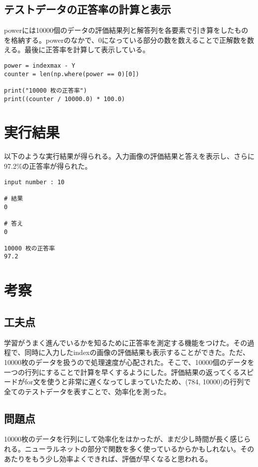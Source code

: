 \documentclass{ujarticle}
\begin{document}
\subsection{テストデータの正答率の計算と表示}
powerには10000個のデータの評価結果列と解答列を各要素で引き算をしたものを格納する。powerのなかで、0になっている部分の数を数えることで正解数を数える。最後に正答率を計算して表示している。
\begin{lstlisting}[basicstyle=\ttfamily\footnotesize, frame=single]
power = indexmax - Y
counter = len(np.where(power == 0)[0])

print("10000 枚の正答率")
print((counter / 10000.0) * 100.0)
\end{lstlisting}



\section{実行結果}
以下のような実行結果が得られる。入力画像の評価結果と答えを表示し、さらに97.2\%の正答率が得られた。
\begin{lstlisting}[basicstyle=\ttfamily\footnotesize, frame=single]
input number : 10

# 結果 
0

# 答え 
0

10000 枚の正答率
97.2
\end{lstlisting}


\section{考察}
\subsection{工夫点}
学習がうまく進んでいるかを知るために正答率を測定する機能をつけた。その過程で、同時に入力したindexの画像の評価結果も表示することができた。ただ、10000枚のデータを扱うので処理速度が心配された。そこで、10000個のデータを一つの行列にすることで計算を早くするようにした。評価結果の返ってくるスピードがfor文を使うと非常に遅くなってしまっていたため、(784, 10000)の行列で全てのテストデータを表すことで、効率化を測った。\\

\subsection{問題点}
10000枚のデータを行列にして効率化をはかったが、まだ少し時間が長く感じられる。ニューラルネットの部分で関数を多く使っているからかもしれない。そのあたりをもう少し効率よくできれば、評価が早くなると思われる。
\end{document}
